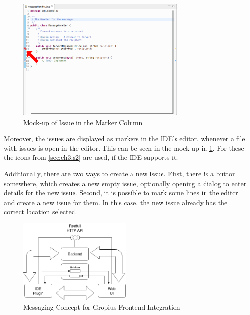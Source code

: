 \begin{figure}[!h]
	\centering
	\includegraphics[width=0.75\textwidth]{graphics/concept_mockup_issueMarker_arrow.png}
	\caption{Mock-up of Issue in the Marker Column}
	\label{fig:c3:mockup_issueMarkers}
\end{figure}
Moreover, the issues are displayed as markers in the \gls{IDE}'s editor, whenever a file with issues is open in the editor.
This can be seen in the mock-up in \cref{fig:c3:mockup_issueMarkers}. 
For these the icons from \cref{sec:ch3:s2} are used, if the \gls{IDE} supports it.

Additionally, there are two ways to create a new issue.
First, there is a button somewhere, which creates a new empty issue, 
optionally opening a dialog to enter details for the new issue.
Second, it is possible to mark some lines in the editor and create a new issue for them.
In this case, the new issue already has the correct location selected.

\begin{figure}[!h]
	\centering
	\includegraphics[width=0.5\textwidth]{graphics/concept_gropius_frontend_messaging.png}
	\caption{Messaging Concept for Gropius Frontend Integration}
	\label{fig:c3:concept_gropius_messaging}
\end{figure}

